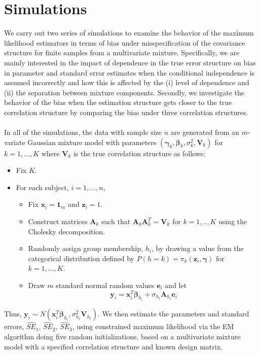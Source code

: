\documentclass[10pt]{article}
\newcommand{\B}[0]{\mathbf}
\newcommand{\bs}[0]{\boldsymbol}
\begin{document}
 \section{Simulations}
We carry out two series of simulations to examine the behavior of the maximum likelihood estimators in terms of bias under misspecification of the covariance structure for finite samples from a multivariate mixture. Specifically, we are mainly interested in the impact of dependence in the true error structure on bias in parameter and standard error estimates when the conditional independence is assumed incorrectly and how this is affected by the (i) level of dependence and (ii) the separation between mixture components. Secondly, we investigate the behavior of the bias when the estimation structure gets closer to the true correlation structure by comparing the bias under three correlation structures.\\\\
In all of the simulations, the data with sample size $n$ are generated from an $m$-variate Gaussian mixture model with parameters $(\bs\gamma_{k},\bs\beta_{k},\sigma^{2}_{k},\B V_k)$ for $k=1,...,K$ where $\B V_k$ is the true correlation structure as follows:
\begin{itemize}
\item Fix $K$. 
\item For each subject, $i=1,...,n$, 
\begin{itemize}
\item Fix $\B x_{i} = \B 1_{m}$ and $\B z_{i}=1$.
\item Construct matrices $\B A_k$ such that $\B A_k\B A_k^{T}=\B V_k$ for $k=1,..,K$ using the Cholesky decomposition. 
\item Randomly assign group membership, $h_{i}$, by drawing a value from the categorical distribution defined by $P(h=k)=\pi_{k}(\B z_{i},\bs\gamma)$ for $k=1,...,K$. 
\item Draw $m$ standard normal random values $\B e_{i}$ and let
$$\B y_{i}=\B x_{i}^{T}\bs\beta_{h_{i}}+\sigma_{h_{i}}\B A_{h_{i}}\B e_{i}$$
\end{itemize}
\end{itemize}
Thus, $\B y_{i}\sim N(\B x_{i}^{T}\bs\beta_{h_{i}},\sigma_{h_{i}}^{2}\B V_{h_{i}})$. We then estimate the parameters and standard errors, $\widehat{SE}_1$, $\widehat{SE}_2$, $\widehat{SE}_3$, using constrained maximum likelihood via the EM algorithm \cite{hathaway1985} doing five random initializations, based on a multivariate mixture model with a specified correlation structure and known design matrix.\\\\
\end{document}
